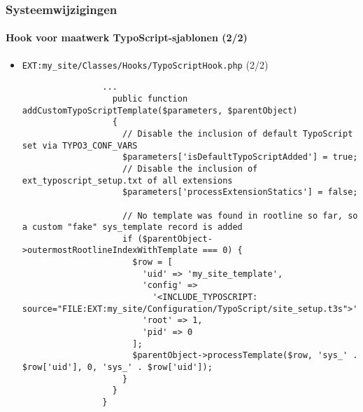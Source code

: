 \begin{frame}[fragile]
	\frametitle{Systeemwijzigingen}
	\framesubtitle{Hook voor maatwerk TypoScript-sjablonen (2/2)}

	\lstset{basicstyle=\tiny\ttfamily}

	\begin{itemize}
		\item \texttt{EXT:my\_site/Classes/Hooks/TypoScriptHook.php} (2/2)

			\begin{lstlisting}
				...
				  public function addCustomTypoScriptTemplate($parameters, $parentObject)
				  {
				    // Disable the inclusion of default TypoScript set via TYPO3_CONF_VARS
				    $parameters['isDefaultTypoScriptAdded'] = true;
				    // Disable the inclusion of ext_typoscript_setup.txt of all extensions
				    $parameters['processExtensionStatics'] = false;

				    // No template was found in rootline so far, so a custom "fake" sys_template record is added
				    if ($parentObject->outermostRootlineIndexWithTemplate === 0) {
				      $row = [
				        'uid' => 'my_site_template',
				        'config' =>
					      '<INCLUDE_TYPOSCRIPT: source="FILE:EXT:my_site/Configuration/TypoScript/site_setup.t3s">',
				        'root' => 1,
				        'pid' => 0
				      ];
				      $parentObject->processTemplate($row, 'sys_' . $row['uid'], 0, 'sys_' . $row['uid']);
				    }
				  }
				}
			\end{lstlisting}

	\end{itemize}

\end{frame}

